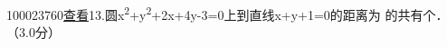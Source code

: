 \documentclass[a4paper,11pt]{article}
\begin{document}
 \hspace*{0.333em}100023760\hspace*{0.333em}\hspace*{0.333em}\href{../question/viewQuestionDetail.jsp?questionID=100023760&amp;testPaperId=100229072}{查看}\hspace*{0.333em}\hspace*{0.333em}13.圆x\textsuperscript{2}+y\textsuperscript{2}+2x+4y-3=0上到直线x+y+1=0的距离为 的共有个． \\
\hspace*{0.333em}\hspace*{0.333em}（3.0分）\\


 \hspace*{0.333em}

 \hspace*{0.333em}

 \hspace*{0.333em}

 \hspace*{0.333em}

 \hspace*{0.333em}
\end{document}
